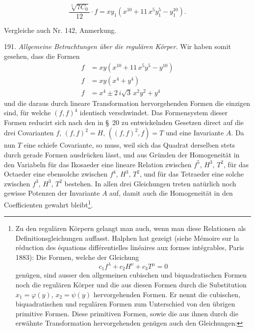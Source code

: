\[
\frac{\sqrt[5]{7C_0}}{12}\cdot f = xy_1(x^{10}+11\,x^5y_1^{5}-y_1^{10}).
\]

Vergleiche auch Nr. 142, Anmerkung.

191. \textit{Allgemeine Betrachtungen über die regulären Körper.} Wir haben somit gesehen, dass die Formen
\[
\begin{aligned}
f &= xy(x^{10}+11\,x^5y^5-y^{10})\\
f &= xy(x^4+y^4)\\
f &= x^4 \pm 2\,i\sqrt{3}\,x^2y^2+y^4
\end{aligned}
\]
und die daraus durch lineare Transformation hervorgehenden Formen die einzigen sind, für welche $(f,f)^4$ identisch verschwindet. Das Formensystem dieser Formen reducirt sich nach den in \S~20 zu entwickelnden Gesetzen direct auf die drei Covarianten $f$, $(f,f)^2=H$, $((f,f)^2,f)=T$ und eine Invariante $A$. Da nun $T$ eine schiefe Covariante, so muss, weil sich das Quadrat derselben stets durch gerade Formen ausdrücken lässt, und aus Gründen der Homogeneität in den Variabeln für das Ikosaeder eine lineare Relation zwischen $f^5$, $H^3$, $T^2$, für das Octaeder eine ebensolche zwischen $f^4$, $H^3$, $T^2$, und für das Tetraeder eine solche zwischen $f^3$, $H^3$, $T^2$ bestehen. In allen drei Gleichungen treten natürlich noch gewisse Potenzen der Invariante $A$ auf, damit auch die Homogeneität in den Coefficienten gewahrt bleibt\footnote{Zu den regulären Körpern gelangt man auch, wenn man diese Relationen als Definitionsgleichungen auffasst. Halphen hat gezeigt (siehe \glqq Mémoire sur la réduction des équations différentielles linéaires aux formes intégrables\grqq{}, Paris 1883): Die Formen, welche der Gleichung
\[
c_1f^{\lambda}+c_2H^{\nu}+c_3T^{\mu}=0
\]
genügen, sind ausser den allgemeinen cubischen und biquadratischen Formen noch die regulären Körper und die aus diesen Formen durch die Substitution $x_1=\varphi(y)$, $x_2=\psi(y)$ hervorgehenden Formen. Er nennt die cubischen, biquadratischen und regulären Formen zum Unterschied von den übrigen \glqq primitive Formen\grqq{}. Diese primitiven Formen, sowie die aus ihnen durch die erwähnte Transformation hervorgehenden genügen auch den Gleichungen:
}.

